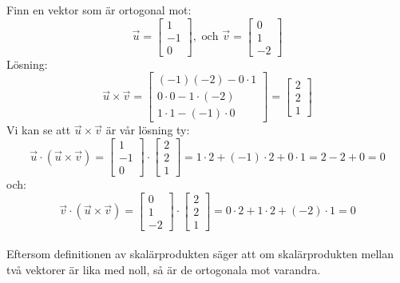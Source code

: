 \begin{Ex}
    Finn en vektor som är ortogonal mot:
    \[
        \vec{u} = \begin{bmatrix} 1\\-1\\0 \end{bmatrix}, \mbox{ och } \vec{v} = \begin{bmatrix}0\\1\\-2  \end{bmatrix}
    \]
    Lösning:
    \[
        \vec{u} \times \vec{v} = \begin{bmatrix} (-1)(-2) - 0 \cdot 1\\0 \cdot 0 - 1 \cdot (-2)\\1 \cdot 1 - (-1) \cdot 0 \end{bmatrix} = \begin{bmatrix} 2\\2\\1 \end{bmatrix}
    \]
    Vi kan se att $\vec{u} \times \vec{v}$ är vår lösning ty:
    \[
        \vec{u} \cdot (\vec{u} \times \vec{v}) = \begin{bmatrix} 1\\-1\\0 \end{bmatrix} \cdot \begin{bmatrix} 2\\2\\1 \end{bmatrix} = 1 \cdot 2 + (-1) \cdot 2 + 0 \cdot 1 = 2 -2 + 0 = 0
    \]
    och:
    \[
        \vec{v} \cdot (\vec{u} \times \vec{v}) = \begin{bmatrix} 0\\1\\-2 \end{bmatrix} \cdot \begin{bmatrix} 2\\2\\1 \end{bmatrix} = 0 \cdot 2 + 1 \cdot 2 + (-2) \cdot 1 =0
    \]\\
    Eftersom definitionen av skalärprodukten säger att om skalärprodukten mellan två vektorer är lika med noll, så är de ortogonala mot varandra.
\end{Ex}



 






















